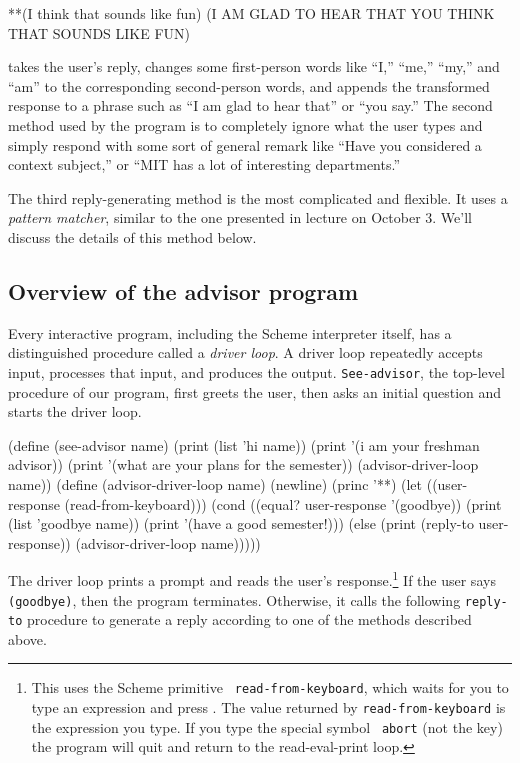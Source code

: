 \beginlisp
**(I think that sounds like fun)
(I AM GLAD TO HEAR THAT YOU THINK THAT SOUNDS LIKE FUN)
\endlisp

\noindent
takes the user's reply, changes some first-person words like ``I,''
``me,'' ``my,'' and ``am'' to the corresponding second-person words,
and appends the transformed response to a phrase such as ``I am glad
to hear that'' or ``you say.''  The second method used by the program
is to completely ignore what the user types and simply respond with
some sort of general remark like ``Have you considered a context
subject,'' or ``MIT has a lot of interesting departments.''

The third reply-generating method is the most complicated and
flexible.  It uses a {\em pattern matcher}, similar to the one
presented in lecture on October 3.  We'll discuss the details of this
method below.

\subsection{Overview of the advisor program}

Every interactive program, including the Scheme interpreter itself,
has a distinguished procedure called a {\em driver loop}.  A driver
loop repeatedly accepts input, processes that input, and produces the
output.  {\tt See-advisor}, the top-level procedure of our program,
first greets the user, then asks an initial question and starts the
driver loop.

\beginlisp
(define (see-advisor name)
  (print (list 'hi name))
  (print '(i am your freshman advisor))
  (print '(what are your plans for the semester))
  (advisor-driver-loop name))
\null
(define (advisor-driver-loop name)
  (newline)
  (princ '**)
  (let ((user-response (read-from-keyboard)))
    (cond ((equal? user-response '(goodbye))
           (print (list 'goodbye name))
           (print '(have a good semester!)))
          (else (print (reply-to user-response))
                (advisor-driver-loop name)))))
\endlisp

The driver loop prints a prompt and reads the user's
response.\footnote{This uses the Scheme primitive {\tt
read-from-keyboard}, which waits for you to type an expression and
press .  The value returned by {\tt read-from-keyboard}
is the expression you type.  If you type the special symbol {\tt
abort} (not the  key) the program will quit and return to
the read-eval-print loop.} If the user says {\tt (goodbye)}, then the
program terminates.  Otherwise, it calls the following {\tt reply-to}
procedure to generate a reply according to one of the methods
described above.

